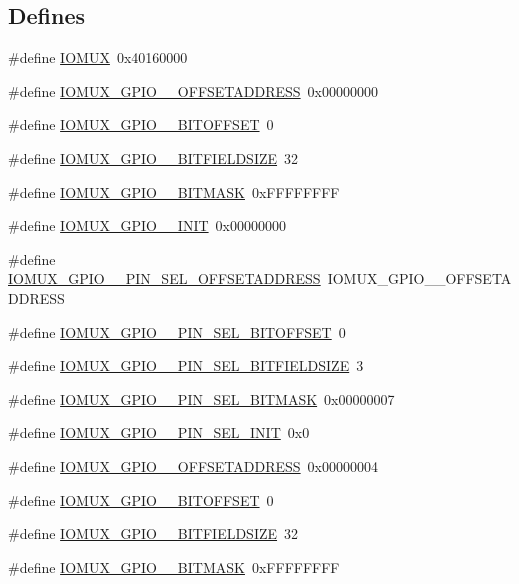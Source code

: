 \subsection*{Defines}
\begin{DoxyCompactItemize}
\item 
\#define \hyperlink{a00560_acf062214366711a616da00cf0ea9abaa}{IOMUX}~0x40160000
\item 
\#define \hyperlink{a00560_ad9f4a5d746f4029f2f16d79bf68676b3}{IOMUX\_\-GPIO\_\_\-OFFSETADDRESS}~0x00000000
\item 
\#define \hyperlink{a00560_a8a709ad49cf1bf1a68543b76d6933bd6}{IOMUX\_\-GPIO\_\_\-BITOFFSET}~0
\item 
\#define \hyperlink{a00560_a3e40cf35e9878fee92ef96689593b091}{IOMUX\_\-GPIO\_\_\-BITFIELDSIZE}~32
\item 
\#define \hyperlink{a00560_a2538dba29e0a41844e17210c89844fd6}{IOMUX\_\-GPIO\_\_\-BITMASK}~0xFFFFFFFF
\item 
\#define \hyperlink{a00560_a66abb81a94ff0dec3bf664184a4c5028}{IOMUX\_\-GPIO\_\_\-INIT}~0x00000000
\item 
\#define \hyperlink{a00560_adc7e8f8d738814c2137a181103b4fe98}{IOMUX\_\-GPIO\_\_\-PIN\_\-SEL\_\-OFFSETADDRESS}~IOMUX\_\-GPIO\_\_\-OFFSETADDRESS
\item 
\#define \hyperlink{a00560_a89bd51e8f4e8a3ae85c091b4b822aeeb}{IOMUX\_\-GPIO\_\_\-PIN\_\-SEL\_\-BITOFFSET}~0
\item 
\#define \hyperlink{a00560_a6fe417d1a60f9ee2daa184400fd42605}{IOMUX\_\-GPIO\_\_\-PIN\_\-SEL\_\-BITFIELDSIZE}~3
\item 
\#define \hyperlink{a00560_abc645af020c5e73f0f584229dca1f2ed}{IOMUX\_\-GPIO\_\_\-PIN\_\-SEL\_\-BITMASK}~0x00000007
\item 
\#define \hyperlink{a00560_aed70beae6540d5c04a015770a96caa22}{IOMUX\_\-GPIO\_\_\-PIN\_\-SEL\_\-INIT}~0x0
\item 
\#define \hyperlink{a00560_a0f0a9e94a2d25b3c8156aa366123ba98}{IOMUX\_\-GPIO\_\_\-OFFSETADDRESS}~0x00000004
\item 
\#define \hyperlink{a00560_a61afce0f697d66647e66a876f7f0399d}{IOMUX\_\-GPIO\_\_\-BITOFFSET}~0
\item 
\#define \hyperlink{a00560_a9b9969dd63f3bf356f27da3801e8e3af}{IOMUX\_\-GPIO\_\_\-BITFIELDSIZE}~32
\item 
\#define \hyperlink{a00560_aa2906b7b01175ca32b3eba1a8114c6b2}{IOMUX\_\-GPIO\_\_\-BITMASK}~0xFFFFFFFF
\item 

\end{DoxyCompactItemize}
